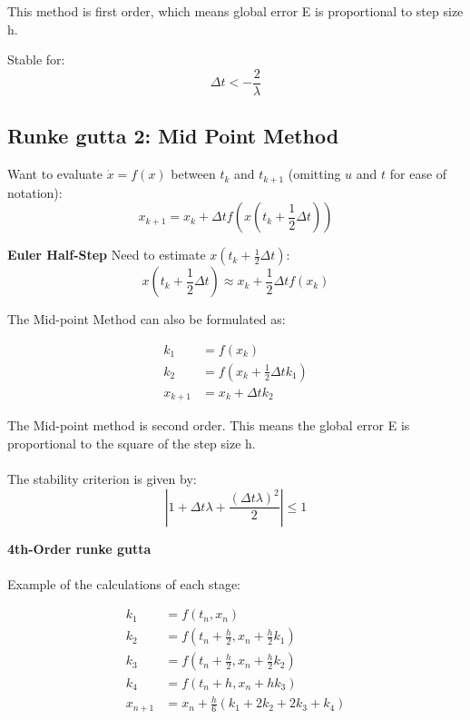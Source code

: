 This method is first order, which means global error E is proportional to step size h. 

Stable for: \[\Delta t < - \frac{2}{\lambda}\]

\subsection{Runke gutta 2: Mid Point Method }

Want to evaluate \(\dot{x} = f(x)\) between \(t_k\) and \(t_{k+1}\) (omitting \(u\) and \(t\) for ease of notation):
\begin{equation}
x_{k+1} = x_k + \Delta t f\left( x \left( t_k + \frac{1}{2} \Delta t \right) \right)
\end{equation}

\textbf{Euler Half-Step}
Need to estimate \(x \left( t_k + \frac{1}{2} \Delta t \right)\):
\begin{equation}
x \left( t_k + \frac{1}{2} \Delta t \right) \approx x_k + \frac{1}{2} \Delta t f(x_k)
\end{equation}

The Mid-point Method can also be formulated as:

\begin{align}
k_1 &= f(x_k) \\
k_2 &= f\left(x_k + \frac{1}{2} \Delta t k_1\right) \\
x_{k+1} &= x_k + \Delta t k_2
\end{align}

The Mid-point method is second order.  This means the global error E is proportional to the square of the step size h.
\\
\\
The stability criterion is given by:
\begin{equation}
\left| 1 + \Delta t \lambda + \frac{(\Delta t \lambda)^2}{2} \right| \leq 1
\end{equation}

\textbf{4th-Order runke gutta }
\\
\\
Example of the calculations of each stage:

\begin{align}
k_1 &= f(t_n, x_n) \\
k_2 &= f\left(t_n + \frac{h}{2}, x_n + \frac{h}{2} k_1\right) \\
k_3 &= f\left(t_n + \frac{h}{2}, x_n + \frac{h}{2} k_2\right) \\
k_4 &= f(t_n + h, x_n + h k_3) \\
x_{n+1} &= x_n + \frac{h}{6} \left( k_1 + 2k_2 + 2k_3 + k_4 \right)
\end{align}

